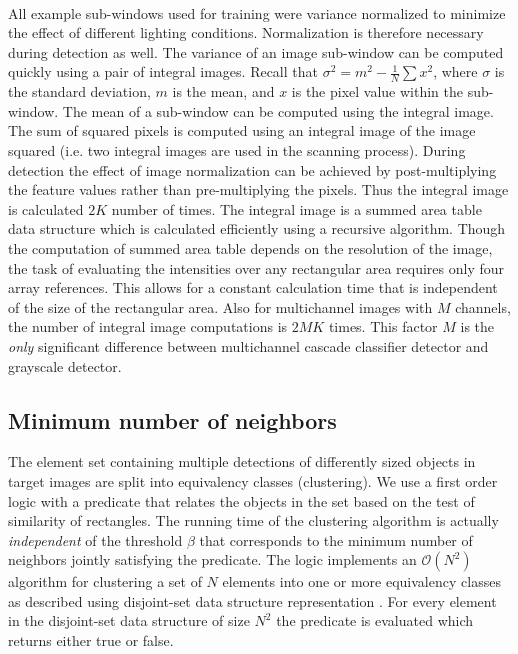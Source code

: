 \paragraph{}
All example sub-windows used for training were variance normalized to minimize the effect of different lighting conditions. Normalization is therefore necessary during
detection as well. The variance of an image sub-window can be computed quickly using a pair of integral images. Recall that $\sigma^2 = m^2 - \frac{1}{N}\sum x^2$, where $\sigma$ is the standard deviation, $m$ is the mean, and $x$ is the pixel value within the sub-window. The mean of a sub-window can be computed using the integral image. The sum of squared pixels is computed using an integral image of the image squared (i.e. two integral images are used in the scanning process). During detection the effect of image normalization can be achieved by post-multiplying the feature values rather than pre-multiplying the pixels. Thus the integral image is calculated $2K$ number of times. The integral image is a summed area table data structure which is calculated  efficiently using a recursive algorithm. Though the computation of summed area table depends on the resolution of the image, the task of evaluating the intensities over any rectangular area requires only four array references. This allows for a constant calculation time that is independent of the size of the rectangular area. Also for multichannel images with $M$ channels, the number of integral image computations is $2MK$ times. This factor $M$ is the \textit{only} significant difference between multichannel cascade classifier detector and grayscale detector.

\subsection{Minimum number of neighbors}

The element set containing multiple detections of differently sized objects in target images are split into equivalency classes (clustering). We use a first order logic with a predicate that relates the objects in the set based on the test of similarity of rectangles. The running time of the clustering algorithm is actually \textit{independent} of the threshold $\beta$ that corresponds to the minimum number of neighbors jointly satisfying the predicate. The logic implements an $\mathcal{O}(N^2)$ algorithm for clustering a set of $N$ elements into one or more equivalency classes \cite{classifier1} as described using disjoint-set data structure representation \cite{classifier2}. For every element in the disjoint-set data structure of size $N^2$ the predicate is evaluated which returns either true or false. 
